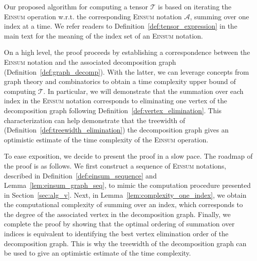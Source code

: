 \documentclass[twoside,11pt]{article}
\def\Einsum{\textsc{Einsum}}
\def\calA{\mathcal{A}}
\def\calT{\mathcal{T}}
\begin{document}
Our proposed algorithm for computing a tensor $\calT$ is based on iterating the \Einsum{} operation w.r.t. the corresponding \Einsum{} notation $\calA$, summing over one index at a time. We refer readers to Definition~\ref{def:tensor_expression} in the main text for the meaning of the index set of an \Einsum{} notation. 

On a high level, the proof proceeds by establishing a correspondence between the \Einsum{} notation and the associated decomposition graph (Definition~\ref{def:graph_decomp}). With the latter, we can leverage concepts from graph theory and combinatorics to obtain a time complexity upper bound of computing $\calT$. In particular, we will demonstrate that the summation over each index in the \Einsum{} notation corresponds to eliminating one vertex of the decomposition graph following Definition~\ref{def:vertex_elimination}. This characterization can help demonstrate that the treewidth of (Definition~\ref{def:treewidth_elimination}) the decomposition graph gives an optimistic estimate of the time complexity of the \Einsum{} operation.

To ease exposition, we decide to present the proof in a slow pace. The roadmap of the proof is as follows. We first construct a sequence of \Einsum{} notations, described in Definition~\ref{def:einsum_sequence} and Lemma~\ref{lem:einsum_graph_seq}, to mimic the computation procedure presented in Section~\ref{sec:alg_v}. Next, in Lemma~\ref{lem:complexity_one_index}, we obtain the computational complexity of summing over an index, which corresponds to the degree of the associated vertex in the decomposition graph. Finally, we complete the proof by showing that the optimal ordering of summation over indices is equivalent to identifying the best vertex elimination order of the decomposition graph. This is why the treewidth of the decomposition graph can be used to give an optimistic estimate of the time complexity.
\end{document}
